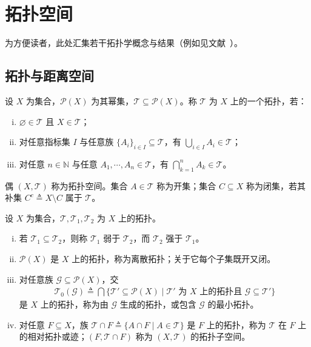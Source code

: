 \documentclass[../main.tex]{subfiles}
\begin{document}
\chapter{拓扑空间}\label{chapter:appA-拓扑空间}

为方便读者，此处汇集若干拓扑学概念与结果（例如见文献~\cite{ref60}）。

\section{拓扑与距离空间}\label{section:appA-拓扑定义}

\begin{definition}[拓扑与拓扑空间]\label{definition:appA-拓扑}
设 $X$ 为集合，$\mathcal{P}(X)$ 为其幂集，$\mathscr{T}\subseteq\mathcal{P}(X)$。称 $\mathscr{T}$ 为 $X$ 上的一个拓扑，若：
\begin{enumerate}[(i)]
\item $\varnothing\in\mathscr{T}$ 且 $X\in\mathscr{T}$；
\item 对任意指标集 $I$ 与任意族 $\{A_i\}_{i\in I}\subseteq\mathscr{T}$，有 $\bigcup_{i\in I}A_i\in\mathscr{T}$；
\item 对任意 $n\in\mathbb{N}$ 与任意 $A_1,\cdots ,A_n\in\mathscr{T}$，有 $\bigcap_{k=1}^nA_k\in\mathscr{T}$。
\end{enumerate}
偶 $(X,\mathscr{T})$ 称为拓扑空间。集合 $A\in\mathscr{T}$ 称为开集；集合 $C\subseteq X$ 称为闭集，若其补集 $C^c\triangleq X\setminus C$ 属于 $\mathscr{T}$。
\end{definition}

\begin{definition}\label{definition:appA-拓扑关系}
设 $X$ 为集合，$\mathscr{T},\mathscr{T}_1,\mathscr{T}_2$ 为 $X$ 上的拓扑。
\begin{enumerate}[(i)]
\item 若 $\mathscr{T}_1\subseteq\mathscr{T}_2$，则称 $\mathscr{T}_1$ 弱于 $\mathscr{T}_2$，而 $\mathscr{T}_2$ 强于 $\mathscr{T}_1$。
\item $\mathcal{P}(X)$ 是 $X$ 上的拓扑，称为离散拓扑；关于它每个子集既开又闭。
\item 对任意族 $\mathscr{G}\subseteq\mathcal{P}(X)$，交
\begin{align*}
\mathscr{T}_0(\mathscr{G})\triangleq\bigcap\{\mathscr{T}'\subseteq\mathcal{P}(X)\mid \mathscr{T}'\text{ 为 }X\text{ 上的拓扑且 }\mathscr{G}\subseteq\mathscr{T}'\}
\end{align*}
是 $X$ 上的拓扑，称为由 $\mathscr{G}$ 生成的拓扑，或包含 $\mathscr{G}$ 的最小拓扑。
\item 对任意 $F\subseteq X$，族 $\mathscr{T}\cap F\triangleq\{A\cap F\mid A\in\mathscr{T}\}$ 是 $F$ 上的拓扑，称为 $\mathscr{T}$ 在 $F$ 上的相对拓扑或迹；$(F,\mathscr{T}\cap F)$ 称为 $(X,\mathscr{T})$ 的拓扑子空间。
\end{enumerate}
\end{definition}
\end{document}
